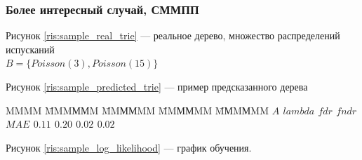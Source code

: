 \documentclass{matmex-diploma-custom}
\begin{document}
\subsubsection{Более интересный случай, СММПП}
Рисунок \ref{ris:sample_real_trie} --- реальное дерево, множество распределений испусканий 
\\$B = \{\textit{Poisson}(3), \textit{Poisson}(15)\}$ 

Рисунок \ref{ris:sample_predicted_trie} --- пример предсказанного дерева
\begin{tabbing}
MMMM \= MMMММM \= MMММMM \= MMММMM \= MМMМMM \kill
\bf{}  \> {\bf $\textit{A}$} \> {\bf $\textit{lambda}$} \> {\bf $\textit{fdr}$} \> {\bf $\textit{fndr}$}\\ 
$\textit{MAE}$ \> $0.11$ \> $0.20$ \> $0.02$ \> $0.02$ \
\end{tabbing}
Рисунок \ref{ris:sample_log_likelihood} --- график обучения.
\end{document}
